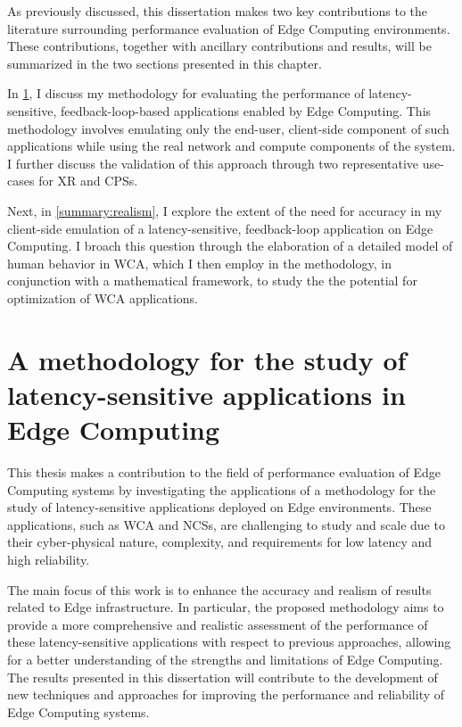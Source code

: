 As previously discussed, this dissertation makes two key contributions to the literature surrounding performance evaluation of Edge Computing environments.
These contributions, together with ancillary contributions and results, will be summarized in the two sections presented in this chapter.

In \cref{summary:methodology}, I discuss my methodology for evaluating the performance of latency-sensitive, feedback-loop-based applications enabled by Edge Computing.
This methodology involves emulating only the end-user, client-side component of such applications while using the real network and compute components of the system. 
I further discuss the validation of this approach through two representative use-cases for \gls{XR} and \glspl{CPS}.

Next, in \cref{summary:realism}, I explore the extent of the need for accuracy in my client-side emulation of a latency-sensitive, feedback-loop application on Edge Computing.
I broach this question through the elaboration of a detailed model of human behavior in \gls{WCA}, which I then employ in the methodology, in conjunction with a mathematical framework, to study the the potential for optimization of \gls{WCA} applications.

\section{A methodology for the study of latency-sensitive applications in Edge Computing}\label{summary:methodology}

This thesis makes a contribution to the field of performance evaluation of Edge Computing systems by investigating the applications of a methodology for the study of latency-sensitive applications deployed on Edge environments.
These applications, such as \gls{WCA} and \glspl{NCS}, are challenging to study and scale due to their cyber-physical nature, complexity, and requirements for low latency and high reliability.

The main focus of this work is to enhance the accuracy and realism of results related to Edge infrastructure.
In particular, the proposed methodology aims to provide a more comprehensive and realistic assessment of the performance of these latency-sensitive applications with respect to previous approaches, allowing for a better understanding of the strengths and limitations of Edge Computing.
The results presented in this dissertation will contribute to the development of new techniques and approaches for improving the performance and reliability of Edge Computing systems.

